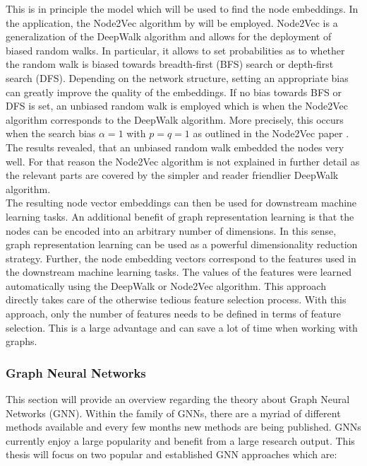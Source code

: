 	\noindent This is in principle the model which will be used to find the node
	embeddings. In the application, the Node2Vec algorithm by will be employed. 
	Node2Vec is a generalization of the DeepWalk algorithm and allows for the deployment of
	biased random walks. In particular, it allows to set probabilities as to
	whether the random walk is biased towards breadth-first (BFS) search or
	depth-first search (DFS). Depending on the network structure, setting an
	appropriate bias can greatly improve the quality of the embeddings. If no
	bias towards BFS or DFS is set, an unbiased random walk is employed which is when
	the Node2Vec algorithm corresponds to the DeepWalk algorithm. More
	precisely, this occurs when the search bias $\alpha = 1$ with $p=q=1$ as
	outlined in the Node2Vec paper \citep[p. 860]{grover2016node2vec}. The results
	revealed, that an unbiased random walk embedded the nodes very well. For
	that reason the Node2Vec algorithm is not explained in further detail as
	the relevant parts are covered by the simpler and reader friendlier 
	DeepWalk algorithm. \\

	\noindent The resulting node vector embeddings can then be used for downstream
	machine learning tasks. An additional benefit of graph representation
	learning is that the nodes can be encoded into an arbitrary number of
	dimensions. In this sense, graph representation learning can be used as a
	powerful dimensionality reduction strategy. Further, the node embedding vectors
	correspond to the features used in the downstream machine learning tasks.
	The values of the features were learned automatically using the DeepWalk or
	Node2Vec algorithm. This approach directly takes care of the otherwise
	tedious feature selection process. With this approach, only the number of
	features needs to be defined in terms of feature selection. This is a large
	advantage and can save a lot of time when working with graphs. 

	\subsubsection{Graph Neural Networks}

	This section will provide an overview regarding the theory about Graph
	Neural Networks (GNN). Within the family of GNNs, there are a myriad of
	different methods available and every few months new methods are being
	published. GNNs currently enjoy a large popularity and benefit from a large
	research output. This thesis will focus on two popular and established GNN
	approaches which are:

